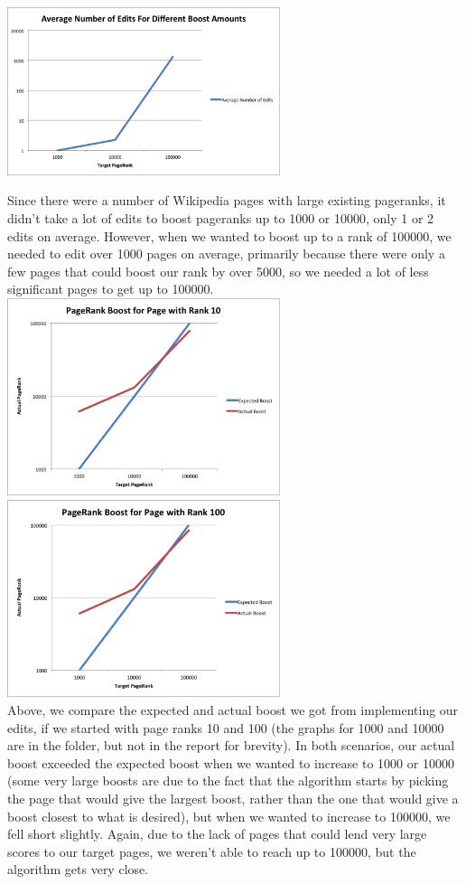 \documentclass{article}
\begin{document}
\includegraphics[width=8cm]{EditsPerBoost}

Since there were a number of Wikipedia pages with large existing pageranks, it
didn't take a lot of edits to boost pageranks up to 1000 or 10000, only 1 or 2
edits on average. However, when we wanted to boost up to a rank of 100000, we
needed to edit over 1000 pages on average, primarily because there were only a
few pages that could boost our rank by over 5000, so we needed a lot of less
significant pages to get up to 100000. \\

\includegraphics[width=8cm]{PageRank10Boost} \includegraphics[width=8cm]{PageRank100Boost} \\

Above, we compare the expected and actual boost we got from implementing our
edits, if we started with page ranks 10 and 100 (the graphs for 1000 and 10000
are in the folder, but not in the report for brevity). In both scenarios, our
actual boost exceeded the expected boost when we wanted to increase to 1000 or
10000 (some very large boosts are due to the fact that the algorithm starts by
picking the page that would give the largest boost, rather than the one that
would give a boost closest to what is desired), but when we wanted to increase
to 100000, we fell short slightly. Again, due to the lack of pages that could
lend very large scores to our target pages, we weren't able to reach up to
100000, but the algorithm gets very close.
\end{document}
